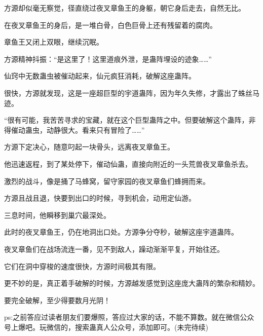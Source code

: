 \begin{this_body}
方源却似毫无察觉，径直绕过夜叉章鱼王的身躯，朝它身后走去，自然无比。

在夜叉章鱼王的身后，是一堆白骨，白色巨骨上还有残留着的腐肉。

章鱼王又闭上双眼，继续沉眠。

方源精神抖振：“是这里了！这里道痕外泄，是蛊阵埋设的迹象……”

仙窍中无数蛊虫被催动起来，仙元疯狂消耗，破解这座蛊阵。

很快，方源就发现，这是一座超巨型的宇道蛊阵，因为年久失修，才露出了蛛丝马迹。

“很有可能，我苦苦寻求的宝藏，就在这个巨型蛊阵之中。但要破解这个蛊阵，非得催动蛊虫，动静很大。看来只有冒险了……”

方源下定决心，随意叼起一块骨头，远离夜叉章鱼王。

他迅速返程，到了某处停下，催动仙蛊，直接向附近的一头荒兽夜叉章鱼杀去。

激烈的战斗，像是捅了马蜂窝，留守家园的夜叉章鱼们蜂拥而来。

方源且战且退，快要到出口的时候，寻到机会，动用定仙游。

三息时间，他瞬移到巢穴最深处。

此时的夜叉章鱼王，仍在地洞出口处。方源争分夺秒，破解这座宇道蛊阵。

夜叉章鱼们在战场流连一番，见不到敌人，躁动渐渐平复，开始往还。

它们在洞中穿梭的速度很快，方源时间极其有限。

更不妙的是，真正着手破解的时候，方源越发感觉到这座庞大蛊阵的繁杂和精妙。

要完全破解，至少得要数月光阴！

ps:之前答应过读者朋友们要爆照，答应过大家的话，不能不算数。就在微信公众号上爆吧。玩微信的，搜索蛊真人公众号，添加即可。(未完待续)

\end{this_body}

